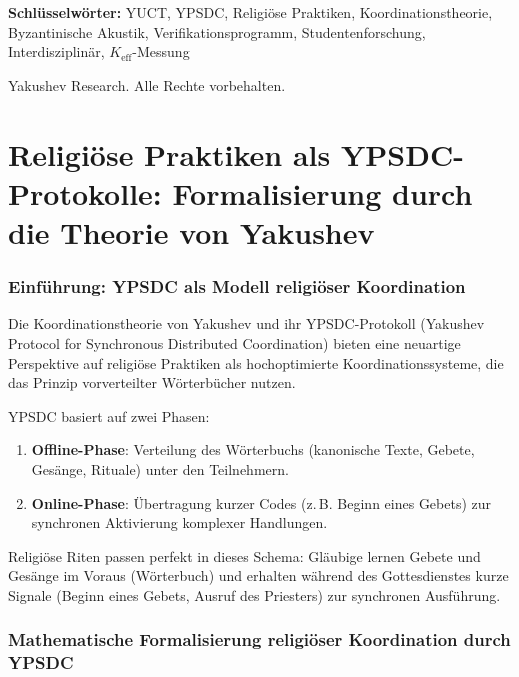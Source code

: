 \documentclass[12pt,a4paper]{article}
\begin{document}
\begin{titlepage}
\begin{center}
			\vspace{0cm}
			
			\noindent
			\small\textbf{Schlüsselwörter:} YUCT, YPSDC, Religiöse Praktiken, Koordinationstheorie, Byzantinische Akustik, Verifikationsprogramm, Studentenforschung, Interdisziplinär, $K_{\mathrm{eff}}$-Messung
			
			\vspace{0.5cm}
			
			\noindent
			 Yakushev Research. Alle Rechte vorbehalten.
		\end{center}
	\end{titlepage}
	
	\tableofcontents
	
	\newpage
	
	\part{Religiöse Praktiken als YPSDC-Protokolle: Formalisierung durch die Theorie von Yakushev}
	
	\section{Einführung: YPSDC als Modell religiöser Koordination}
	
	Die Koordinationstheorie von Yakushev und ihr YPSDC-Protokoll (Yakushev Protocol for Synchronous Distributed Coordination) bieten eine neuartige Perspektive auf religiöse Praktiken als hochoptimierte Koordinationssysteme, die das Prinzip vorverteilter Wörterbücher nutzen.
	
	YPSDC basiert auf zwei Phasen:
	\begin{enumerate}
		\item \textbf{Offline-Phase}: Verteilung des Wörterbuchs (kanonische Texte, Gebete, Gesänge, Rituale) unter den Teilnehmern.
		\item \textbf{Online-Phase}: Übertragung kurzer Codes (z. B. Beginn eines Gebets) zur synchronen Aktivierung komplexer Handlungen.
	\end{enumerate}
	
	Religiöse Riten passen perfekt in dieses Schema: Gläubige lernen Gebete und Gesänge im Voraus (Wörterbuch) und erhalten während des Gottesdienstes kurze Signale (Beginn eines Gebets, Ausruf des Priesters) zur synchronen Ausführung.
	
	\section{Mathematische Formalisierung religiöser Koordination durch YPSDC}
	
\end{document}
